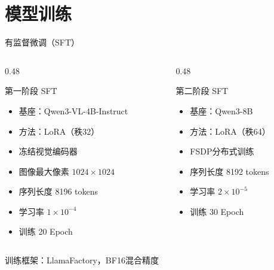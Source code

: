 \documentclass[aspectratio=169,10pt]{beamer}
\begin{document}
\section{模型训练}

\begin{frame}{有监督微调（SFT）}
\begin{columns}[T]
\begin{column}{0.48\textwidth}
\begin{block}{第一阶段 SFT}
\begin{itemize}
  \item 基座：Qwen3-VL-4B-Instruct
  \item 方法：LoRA（秩32）
  \item 冻结视觉编码器
  \item 图像最大像素 $1024\times1024$
  \item 序列长度 8196 tokens
  \item 学习率 $1\times10^{-4}$
  \item 训练 20 Epoch
\end{itemize}
\end{block}
\end{column}
\begin{column}{0.48\textwidth}
\begin{block}{第二阶段 SFT}
\begin{itemize}
  \item 基座：Qwen3-8B
  \item 方法：LoRA（秩64）
  \item FSDP分布式训练
  \item 序列长度 8192 tokens
  \item 学习率 $2\times10^{-5}$
  \item 训练 30 Epoch
\end{itemize}
\end{block}
\end{column}
\end{columns}

\vspace{0.5em}
\centering
训练框架：LlamaFactory，BF16混合精度
\end{frame}
\end{document}
